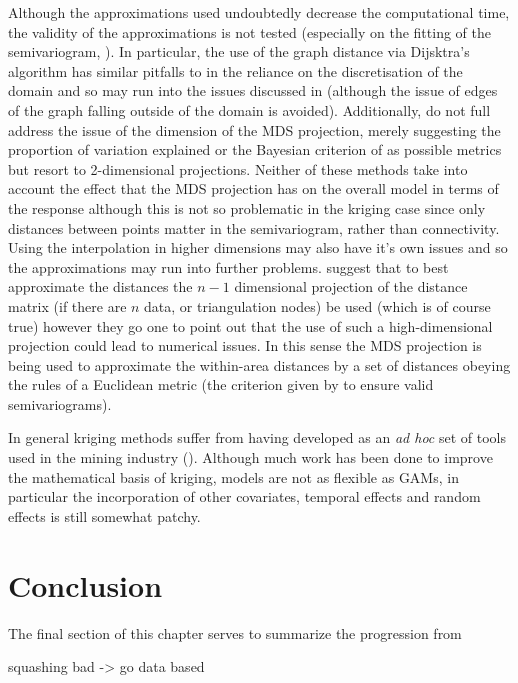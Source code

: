 Although the approximations used undoubtedly decrease the computational time, the validity of the approximations is not tested (especially on the fitting of the semivariogram, ). In particular, the use of the graph distance via Dijsktra's algorithm has similar pitfalls to  in the reliance on the discretisation of the domain and so may run into the issues discussed in  (although the issue of edges of the graph falling outside of the domain is avoided). Additionally,  do not full address the issue of the dimension of the MDS projection, merely suggesting the proportion of variation explained or the Bayesian criterion of  as possible metrics but resort to 2-dimensional projections. Neither of these methods take into account the effect that the MDS projection has on the overall model in terms of the response although this is not so problematic in the kriging case since only distances between points matter in the semivariogram, rather than connectivity. Using the interpolation in higher dimensions may also have it's own issues and so the approximations may run into further problems.  suggest that to best approximate the distances the $n-1$ dimensional projection of the distance matrix (if there are $n$ data, or triangulation nodes) be used (which is of course true) however they go one to point out that the use of such a high-dimensional projection could lead to numerical issues. In this sense the MDS projection is being used to approximate the within-area distances by a set of distances obeying the rules of a Euclidean metric (the criterion given by  to ensure valid semivariograms). 

In general kriging methods suffer from having developed as an \textit{ad hoc} set of tools used in the mining industry (\cite[preface]{diggle}). Although much work has been done to improve the mathematical basis of kriging, models are not as flexible as GAMs, in particular the incorporation of other covariates, temporal effects and random effects is still somewhat patchy.

\section{Conclusion}
\label{gds-conclusion}

The final section of this chapter serves to summarize the progression from 


squashing bad -> go data based

